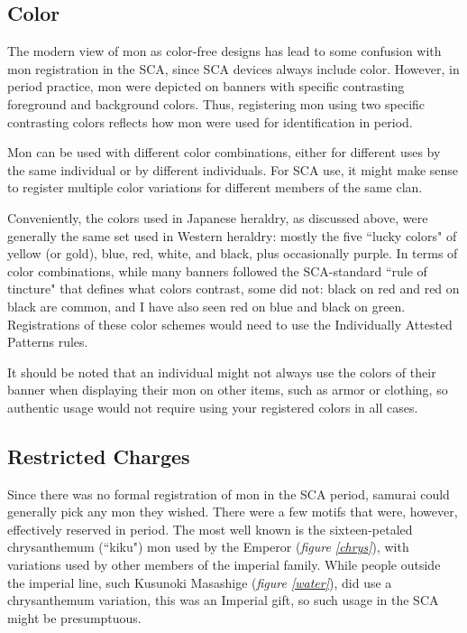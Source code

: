 \documentclass{article}
\begin{document}
\subsection{Color}

  The modern view of mon as color-free designs has lead to some
  confusion with mon registration in the SCA, since SCA devices always
  include color.  However, in period practice, mon were depicted on
  banners with specific contrasting foreground and background colors.
  Thus, registering mon using two specific contrasting colors reflects
  how mon were used for identification in period.

  Mon can be used with different color combinations, either for
  different uses by the same individual or by different individuals.
  For SCA use, it might make sense to register multiple color
  variations for different members of the same clan.

  Conveniently, the colors used in Japanese heraldry, as discussed
  above, were generally the same set used in Western heraldry: mostly
  the five ``lucky colors" of yellow (or gold), blue, red, white, and
  black, plus occasionally purple.  In terms of color combinations,
  while many banners followed the SCA-standard ``rule of tincture"
  that defines what colors contrast, some did not: black on red and
  red on black are common, and I have also seen
  red on blue and black on
  green.  Registrations of these color schemes
  would need to use the Individually Attested Patterns rules.

  It should be noted that an individual might not always use the
  colors of their banner when displaying their mon on other items,
  such as armor or clothing, so authentic usage would not require
  using your registered colors in all cases.

\subsection{Restricted Charges}

  Since there was no formal registration of mon in the SCA period,
  samurai could generally pick any mon they wished.  There were a few motifs
  that were, however, effectively reserved in period.  The most well
  known is the sixteen-petaled chrysanthemum (``kiku") mon used
  by the Emperor (\emph{figure \ref{chrys}}), with variations used by other members of the
  imperial family. While people
  outside the imperial line, such Kusunoki Masashige (\emph{figure \ref{water}}), did use a
  chrysanthemum variation, this was an Imperial gift,
  so such usage in the SCA might be presumptuous.
\end{document}
